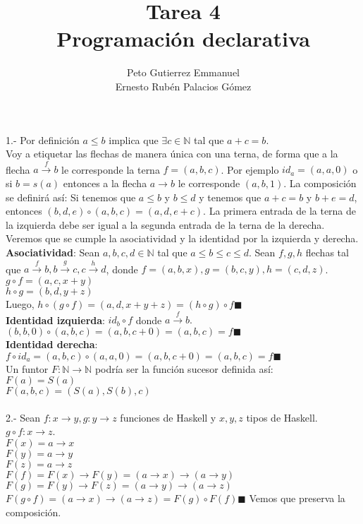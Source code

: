 \documentclass{article}
\title{Tarea 4 \\Programación declarativa}
\author{Peto Gutierrez Emmanuel \\ Ernesto Rubén Palacios Gómez}
\begin{document}
\maketitle

1.- Por definición $a \leq b$ implica que $\exists c \in  \mathbb{N}$ tal que $a+c=b$.\\

Voy a etiquetar las flechas de manera única con una terna, de forma que a la flecha $a \xrightarrow{f} b$ le corresponde la terna $f=(a,b,c)$. Por ejemplo $id_{a}=(a,a,0)$ o si $b=s(a)$ entonces a la flecha $a \rightarrow b$ le corresponde $(a,b,1)$. La composición se definirá así: Si tenemos que $a \leq b$ y $b \leq d$ y tenemos que $a+c=b$ y $b+e=d$, entonces $(b,d,e) \circ (a,b,c) = (a,d,e+c)$. La primera entrada de la terna de la izquierda debe ser igual a la segunda entrada de la terna de la derecha.\\

Veremos que se cumple la asociatividad y la identidad por la izquierda y derecha.\\

\textbf{Asociatividad}: Sean $a,b,c,d \in \mathbb{N}$ tal que $a \leq b \leq c \leq d$. Sean $f,g,h$ flechas tal que $a \xrightarrow{f} b, b \xrightarrow{g} c, c \xrightarrow{h} d$, donde $f=(a,b,x), g=(b,c,y), h=(c,d,z)$.\\ $g \circ f = (a,c,x+y)$ \\ $h \circ g = (b,d,y+z)$ \\
Luego, $h \circ (g \circ f) = (a,d,x+y+z) = (h \circ g) \circ f \blacksquare$ \\

\textbf{Identidad izquierda}: $id_{b} \circ f$ donde $a \xrightarrow{f} b.$ \\ $(b,b,0) \circ (a,b,c)=(a,b,c+0)=(a,b,c) = f \blacksquare$ \\

\textbf{Identidad derecha}: $f \circ id_{a} = (a,b,c) \circ (a,a,0)=(a,b,c+0)=(a,b,c)=f \blacksquare$ \\

Un funtor $F: \mathbb{N} \rightarrow \mathbb{N}$ podría ser la función sucesor definida así: \\
$F(a)=S(a)$ \\
$F(a,b,c)=(S(a),S(b),c)$ \\ \ \\

2.- Sean $f:x \rightarrow y, g:y \rightarrow z$ funciones de Haskell y $x,y,z$ tipos de Haskell. \\ $g \circ f:x \rightarrow z$. \\ $F(x)=a \rightarrow x$ \\ $F(y)=a \rightarrow y$ \\ $F(z)=a \rightarrow z$    \\ $F(f) = F(x) \rightarrow F(y) = (a \rightarrow x) \rightarrow (a \rightarrow y)$ \\ $F(g) = F(y) \rightarrow F(z) = (a \rightarrow y) \rightarrow (a \rightarrow z)$ \\ $ F(g \circ f) = (a \rightarrow x)     \rightarrow (a \rightarrow z) = F(g) \circ F(f) \blacksquare$ Vemos que preserva la composición.\\
\end{document}
